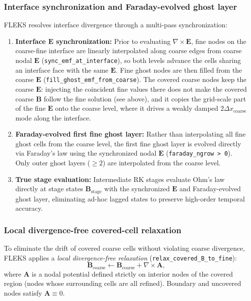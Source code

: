 \documentclass[a4paper, 11pt]{article}
\begin{document}
\subsubsection{Interface synchronization and Faraday-evolved ghost layer}
FLEKS resolves interface divergence through a multi-pass synchronization:
\begin{enumerate}
  \item \textbf{Interface $\mathbf{E}$ synchronization:} Prior to evaluating $\nabla \times \mathbf{E}$, fine nodes on the coarse-fine interface are linearly interpolated along coarse edges from coarse nodal $\mathbf{E}$ (\texttt{sync\_emf\_at\_interface}), so both levels advance the cells sharing an interface face with the same $\mathbf{E}$. Fine ghost nodes are then filled from the coarse $\mathbf{E}$ (\texttt{fill\_ghost\_emf\_from\_coarse}). The covered coarse nodes keep the coarse $\mathbf{E}$: injecting the coincident fine values there does not make the covered coarse $\mathbf{B}$ follow the fine solution (see above), and it copies the grid-scale part of the fine $\mathbf{E}$ onto the coarse level, where it drives a weakly damped $2\Delta x_{\text{coarse}}$ mode along the interface.
  \item \textbf{Faraday-evolved first fine ghost layer:} Rather than interpolating all fine ghost cells from the coarse level, the first fine ghost layer is evolved directly via Faraday's law using the synchronized nodal $\mathbf{E}$ (\texttt{faraday\_ngrow > 0}). Only outer ghost layers ($\ge 2$) are interpolated from the coarse level.
  \item \textbf{True stage evaluation:} Intermediate RK stages evaluate Ohm's law directly at stage states $\mathbf{B}_{\text{stage}}$ with the synchronized $\mathbf{E}$ and Faraday-evolved ghost layer, eliminating ad-hoc lagged states to preserve high-order temporal accuracy.
\end{enumerate}

\subsubsection{Local divergence-free covered-cell relaxation}
To eliminate the drift of covered coarse cells without violating coarse divergence, FLEKS applies a \emph{local divergence-free relaxation} (\texttt{relax\_covered\_B\_to\_fine}):
\begin{equation}
\mathbf{B}_{\text{coarse}} \leftarrow \mathbf{B}_{\text{coarse}} + \nabla \times \mathbf{A},
\label{eq:relax_update}
\end{equation}
where $\mathbf{A}$ is a nodal potential defined strictly on interior nodes of the covered region (nodes whose surrounding cells are all refined). Boundary and uncovered nodes satisfy $\mathbf{A} \equiv 0$.
\end{document}
